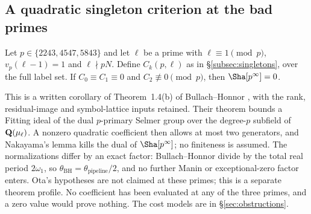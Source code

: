 \subsection{A quadratic singleton criterion at the bad primes}
\begin{criterion}\label{crit:bh}
Let $p\in\{2243,4547,5843\}$ and let $\ell$ be a prime with $\ell\equiv1\pmod p$, $v_p(\ell-1)=1$ and $\ell\nmid pN$. Define $C_k(p,\ell)$ as in \S\ref{subsec:singletons}, over the full label set. If $C_0\equiv C_1\equiv0$ and $C_2\not\equiv0\pmod p$, then $\Sha[p^\infty]=0$.
\end{criterion}
This is a written corollary of Theorem~1.4(b) of Bullach--Honnor \cite{bh}, with the rank, residual-image and symbol-lattice inputs retained. Their theorem bounds a Fitting ideal of the dual $p$-primary Selmer group over the degree-$p$ subfield of $\mathbf{Q}(\mu_\ell)$. A nonzero quadratic coefficient then allows at most two generators, and Nakayama's lemma kills the dual of $\Sha[p^\infty]$; no finiteness is assumed. The normalizations differ by an exact factor: Bullach--Honnor divide by the total real period $2\omega_1$, so $\theta_{\mathrm{BH}}=\theta_{\mathrm{pipeline}}/2$, and no further Manin or exceptional-zero factor enters. Ota's hypotheses are not claimed at these primes; this is a separate theorem profile. No coefficient has been evaluated at any of the three primes, and a zero value would prove nothing. The cost models are in \S\ref{sec:obstructions}.
